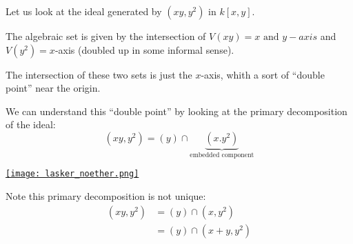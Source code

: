 \begin{example}
    Let us look at the ideal generated by $(xy,y^2)$ in $k[x,y]$.

    The algebraic set is given by the intersection of $V(xy) = x\text{ and }y-axis$ and $V(y^2) = x$-axis (doubled up in some informal sense).

    The intersection of these two sets is just the $x$-axis, whith a sort of ``double point'' near the origin.

    We can understand this ``double point'' by looking at the primary decomposition of the ideal:
    \[(xy,y^2) = (y)\cap \underbrace{(x.y^2)}_{\text{embedded component}}\]

    \href{https://youtu.be/1oKh8QJ1I4k?t=619}{\texttt{[image: lasker\_noether.png]}}

Note this primary decomposition is not unique:\begin{align*}
    (xy,y^2) &= (y)\cap (x,y^2)\\
             &= (y)\cap (x+y,y^2)
\end{align*}

\end{example}

